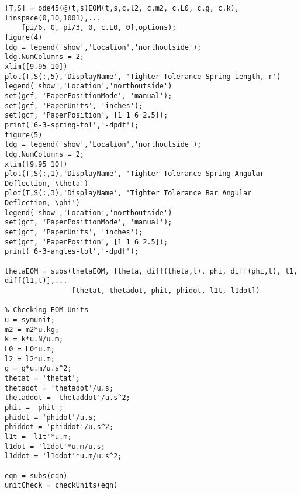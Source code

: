 \begin{lstlisting}[frame=lines,style=Matlab-editor,basicstyle = \mlttfamily]
%---------------------------------------------------------------------%
[T,S] = ode45(@(t,s)EOM(t,s,c.l2, c.m2, c.L0, c.g, c.k), linspace(0,10,1001),...
    [pi/6, 0, pi/3, 0, c.L0, 0],options);
figure(4)
ldg = legend('show','Location','northoutside');
ldg.NumColumns = 2;
xlim([9.95 10])
plot(T,S(:,5),'DisplayName', 'Tighter Tolerance Spring Length, r')
legend('show','Location','northoutside')
set(gcf, 'PaperPositionMode', 'manual');
set(gcf, 'PaperUnits', 'inches');
set(gcf, 'PaperPosition', [1 1 6 2.5]);
print('6-3-spring-tol','-dpdf');
figure(5)
ldg = legend('show','Location','northoutside');
ldg.NumColumns = 2;
xlim([9.95 10])
plot(T,S(:,1),'DisplayName', 'Tighter Tolerance Spring Angular Deflection, \theta')
plot(T,S(:,3),'DisplayName', 'Tighter Tolerance Bar Angular Deflection, \phi')
legend('show','Location','northoutside')
set(gcf, 'PaperPositionMode', 'manual');
set(gcf, 'PaperUnits', 'inches');
set(gcf, 'PaperPosition', [1 1 6 2.5]);
print('6-3-angles-tol','-dpdf');

thetaEOM = subs(thetaEOM, [theta, diff(theta,t), phi, diff(phi,t), l1, diff(l1,t)],...
                [thetat, thetadot, phit, phidot, l1t, l1dot])

% Checking EOM Units
u = symunit;
m2 = m2*u.kg;
k = k*u.N/u.m;
L0 = L0*u.m;
l2 = l2*u.m;
g = g*u.m/u.s^2;
thetat = 'thetat';
thetadot = 'thetadot'/u.s;
thetaddot = 'thetaddot'/u.s^2;
phit = 'phit';
phidot = 'phidot'/u.s;
phiddot = 'phiddot'/u.s^2;
l1t = 'l1t'*u.m;
l1dot = 'l1dot'*u.m/u.s;
l1ddot = 'l1ddot'*u.m/u.s^2;

eqn = subs(eqn)
unitCheck = checkUnits(eqn)
\end{lstlisting}
\newpage
